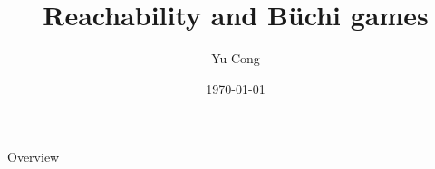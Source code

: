 \documentclass[aspectratio=169]{beamer}
\author{Yu Cong}
\title{Reachability and Büchi games}
\date{\today}
\begin{document}
    \begingroup
        \makeatletter
        \setlength{\hoffset}{.5\beamer@sidebarwidth}
        \makeatother
        
        \begin{frame}[plain]
            \titlepage
        \end{frame}

        \begin{frame}[plain]{Overview}
            \tableofcontents
        \end{frame}
    \endgroup
    
\end{document}

